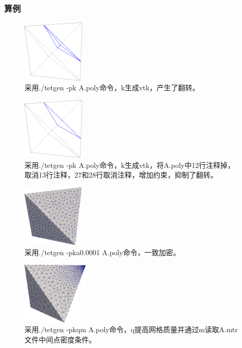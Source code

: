 \subsubsection{算例}

\begin{figure}[!htbp]
  \centering
  \includegraphics[height=3cm]{fig/1/13.png}
  \caption{采用./tetgen -pk A.poly命令，k生成vtk，产生了翻转。}
  \label{fig:1-7}
\end{figure}

\begin{figure}[!htbp]
  \centering
  \includegraphics[height=3cm]{fig/1/14.png}
  \caption{采用./tetgen -pk A.poly命令，k生成vtk，将A.poly中12行注释掉，取消13行注释，27和28行取消注释，增加约束，抑制了翻转。}
  \label{fig:1-7}
\end{figure}

\begin{figure}[!htbp]
  \centering
  \includegraphics[height=3cm]{fig/1/15.png}
  \caption{采用./tetgen -pka0.0001 A.poly命令，一致加密。}
  \label{fig:1-7}
\end{figure}

\begin{figure}[!htbp]
  \centering
  \includegraphics[height=3cm]{fig/1/16.png}
  \caption{采用./tetgen -pkqm A.poly命令，q提高网格质量并通过m读取A.mtr文件中间点密度条件。}
  \label{fig:1-7}
\end{figure}


